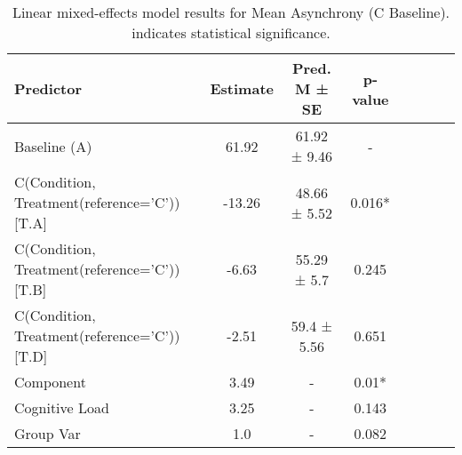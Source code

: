 
    \begin{table}[H]
    \centering
    \begin{small}
    \begin{tabular}{lccccccc}
\toprule
Predictor & Estimate & Pred. M ± SE & p-value \\
\midrule
Baseline (A) & 61.92 & 61.92 ± 9.46 & - \\
C(Condition, Treatment(reference='C'))[T.A] & -13.26 & 48.66 ± 5.52 & 0.016* \\
C(Condition, Treatment(reference='C'))[T.B] & -6.63 & 55.29 ± 5.7 & 0.245 \\
C(Condition, Treatment(reference='C'))[T.D] & -2.51 & 59.4 ± 5.56 & 0.651 \\
Component & 3.49 & - & 0.01* \\
Cognitive Load & 3.25 & - & 0.143 \\
Group Var & 1.0 & - & 0.082 \\
\bottomrule
\end{tabular}

    \end{small}
    \caption[Linear mixed-effects model results for Mean Asynchrony (C Baseline)]{Linear mixed-effects model results for Mean Asynchrony (C Baseline). \newline * indicates statistical significance.}
    \label{tab:meanasynchrony (c baseline)}

    \end{table}